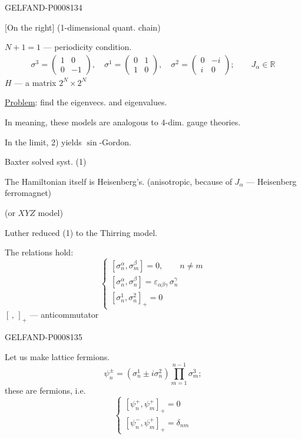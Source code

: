 \begin{GelfandAdjacentEvidence}{GELFAND-P000813}{4}


[On the right] (1-dimensional quant. chain)

\(\boxed{N+1=1}\) — periodicity condition.
\[
\begin{gathered}
\sigma^3=\begin{pmatrix}1&0\\0&-1\end{pmatrix},\quad
\sigma^1=\begin{pmatrix}0&1\\1&0\end{pmatrix},\quad
\sigma^2=\begin{pmatrix}0&-i\\i&0\end{pmatrix};\qquad J_\alpha\in\mathbb R
\end{gathered}
\]
\(H\) — a matrix \(2^N\times2^N\)

\uline{Problem}: find the eigenvecs. and eigenvalues.

In meaning, these models are analogous to 4-dim. gauge theories.

In the limit, 2) yields \(\sin\)-Gordon.

Baxter solved syst. (1)

The Hamiltonian itself is Heisenberg’s. (anisotropic, because of \(J_\alpha\) — Heisenberg ferromagnet)

(or \(XYZ\) model)

Luther reduced (1) to the Thirring model.

The relations hold:
\begin{equation*}
\begin{cases}
[\sigma_n^\alpha,\sigma_m^\beta]=0,\qquad n\ne m\\
[\sigma_n^\alpha,\sigma_n^\beta]=\varepsilon_{\alpha\beta\gamma}\,\sigma_n^\gamma\\
[\sigma_n^1,\sigma_n^2]_+=0
\end{cases}\tag{2}
\end{equation*}
\([\, ,\,]_+\) — anticommutator

\end{GelfandAdjacentEvidence}
\begin{GelfandAdjacentEvidence}{GELFAND-P000813}{5}


Let us make lattice fermions.
\begin{equation*}
\psi_n^\pm=(\sigma_n^1\pm i\sigma_n^2)\prod_{m=1}^{n-1}\sigma_m^3;\tag{3}
\end{equation*}
these are fermions, i.e.
\begin{equation*}
\begin{cases}
[\psi_n^+,\psi_m^+]_+=0\\
[\psi_n^-,\psi_m^+]_+=\delta_{nm}
\end{cases}\tag{4}
\end{equation*}
\end{GelfandAdjacentEvidence}
